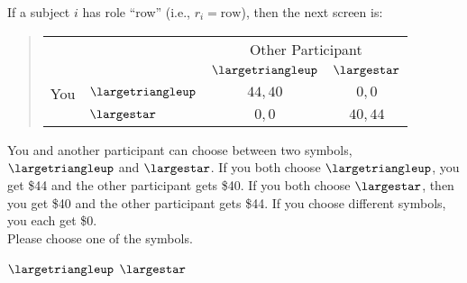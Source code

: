 \documentclass[11pt]{article}
\begin{document}
If a subject $i$ has role ``row'' (i.e., $r_i=\text{row}$), then the next screen is:
\begin{tcolorbox}
\begin{quote}
\begin{center}
\begin{tabular}{llcc}
    & & \multicolumn{2}{c}{Other Participant}  \\
& & $\largetriangleup$ & $\largestar$  \\ \cline{3-4}
You & $\largetriangleup$ & \multicolumn{1}{|c|}{$44,40$} & \multicolumn{1}{c|}{$0,0$}  \\ \cline{3-4}
& $\largestar$ & \multicolumn{1}{|c|}{$0,0$} & \multicolumn{1}{c|}{$40,44$}  \\ \cline{3-4}
\end{tabular}
\end{center}
\end{quote}

You and another participant can choose between two symbols, $\largetriangleup$ and $\largestar$. If you both choose $\largetriangleup$, you get \$44 and the other participant gets \$40. If you both choose $\largestar$, then you get \$40 and the other participant gets \$44. If you choose different symbols, you each get \$0.\\


Please choose one of the symbols.\\

\begin{center}
$\largetriangleup$ \qquad $\largestar$
\end{center}
\end{tcolorbox}
\end{document}
